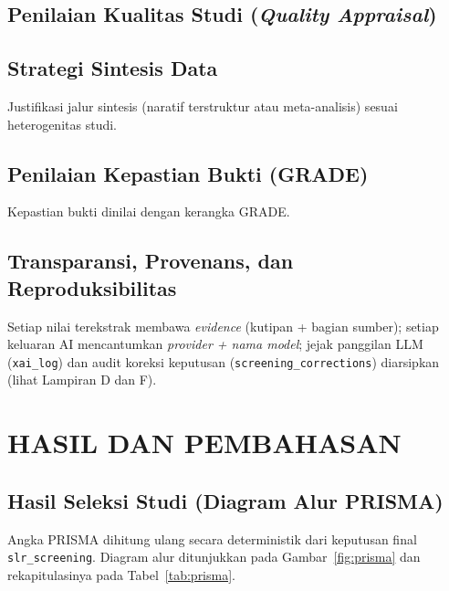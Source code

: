 \documentclass[12pt,a4paper,oneside]{report}
\begin{document}
\section{Penilaian Kualitas Studi (\textit{Quality Appraisal})}

\section{Strategi Sintesis Data}
Justifikasi jalur sintesis (naratif terstruktur atau meta-analisis) sesuai
heterogenitas studi.

\section{Penilaian Kepastian Bukti (GRADE)}
Kepastian bukti dinilai dengan kerangka GRADE.

\section{Transparansi, Provenans, dan Reproduksibilitas}
Setiap nilai terekstrak membawa \emph{evidence} (kutipan + bagian sumber); setiap
keluaran AI mencantumkan \emph{provider + nama model}; jejak panggilan LLM
(\texttt{xai\_log}) dan audit koreksi keputusan (\texttt{screening\_corrections})
diarsipkan (lihat Lampiran D dan F).

\chapter{HASIL DAN PEMBAHASAN}\justifying

\section{Hasil Seleksi Studi (Diagram Alur PRISMA)}
Angka PRISMA dihitung ulang secara deterministik dari keputusan final
\texttt{slr\_screening}. Diagram alur ditunjukkan pada Gambar~\ref{fig:prisma}
dan rekapitulasinya pada Tabel~\ref{tab:prisma}.
\end{document}
